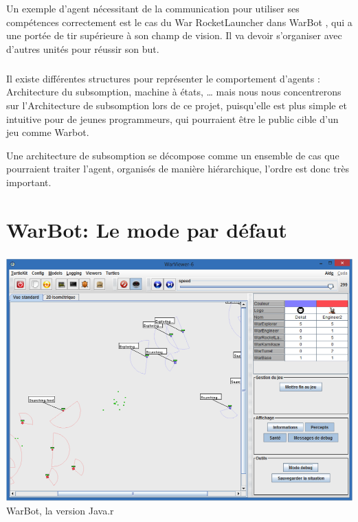 \documentclass{report}
\begin{document}
Un exemple d’agent nécessitant de la communication pour utiliser ses compétences correctement est le cas du War RocketLauncher dans WarBot , qui a une portée de tir supérieure à son champ de vision. Il va devoir s’organiser avec d’autres unités pour réussir son but.
\paragraph{}
Il existe différentes structures pour représenter le comportement d’agents : Architecture du subsomption, machine à états, … mais nous nous concentrerons sur l’Architecture de subsomption lors de ce projet, puisqu’elle est plus simple et intuitive pour de jeunes programmeurs, qui pourraient être le public cible d’un jeu comme Warbot.

Une architecture de subsomption se décompose comme un ensemble de cas que pourraient traiter l’agent, organisés de manière hiérarchique, l’ordre est donc très important.

\newpage
\chapter{WarBot: Le mode par défaut}

\paragraph{}
\begin{center}
\includegraphics[scale=0.7]{DATA/warbotjava.png}
 {WarBot, la version Java.r}
\end{center}
\paragraph{}
\end{document}
